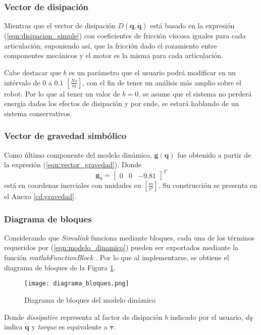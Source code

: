     \subsubsection{Vector de disipación}
    Mientras que el vector de disipación $D(\boldsymbol{q}, \boldsymbol{\dot{q}})$ está basado en la expresión (\ref{eqn:disipacion_simple}) con coeficientes de fricción
    viscosa iguales para cada articulación; suponiendo así, que la fricción dado el rozamiento entre componentes mecánicos y el motor es la misma para cada articulación. 

    Cabe destacar que $b$ es un parámetro que el usuario podrá modificar en un intérvalo de $0$ a $0.1$ $[\frac{Ns}{m}]$, con el fin de tener un análisis más amplio sobre
    el robot. Por lo que al tener un valor de $b=0$, se asume que el sistema no perderá energía dados los efectos de disipación y por ende, se estará hablando de un sistema
    conservativos. 

    \subsubsection{Vector de gravedad simbólico}
    Como último componente del modelo dinámico, $\boldsymbol{g}(\boldsymbol{q})$ fue obtenido a partir de la expresión (\ref{eqn:vector_gravedad}). Donde
    \begin{equation}
        \label{eqn:g_0}
         \boldsymbol{g}_0 = \begin{bmatrix} 0 & 0 & -9.81 \end{bmatrix}^T
    \end{equation}
    está en coordenas inerciales con unidades en $[\frac{m}{s^2}]$. Su construcción se presenta en el Anexo \ref{cd:gravedad}.

    \subsubsection{Diagrama de bloques}
    Considerando que \emph{Simulink} funciona mediante bloques, cada una de los términos requeridos por (\ref{eqn:modelo_dinamico}) pueden ser exportados mediante la
    función \emph{matlabFunctionBlock} \cite{matlabFunctionBlock}. Por lo que al implementarse, se obtiene el diagrama de bloques de la Figura \ref{fig:diagrama_bloques}.
    \begin{figure}[H]
        \texttt{[image: diagrama\_bloques.png]}
        \centering
        \caption{Diagrama de bloques del modelo dinámico}
        \label{fig:diagrama_bloques}
    \end{figure}
    Donde \emph{dissipative} representa al factor de disipación $b$ indicado por el usuario, $dq$ indica $\boldsymbol{\dot{q}}$ y \emph{torque} es equivalente a
    $\boldsymbol{\tau}$. 